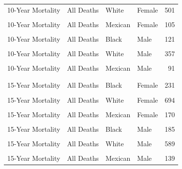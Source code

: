 \documentclass[
]{article}
\begin{document}
\begin{table}[!h]
\begin{tabular}[t]{llllr}
10-Year Mortality & All Deaths & White & Female & 501\\
\cellcolor{gray!10}{10-Year Mortality} & \cellcolor{gray!10}{CVD} & \cellcolor{gray!10}{Mexican} & \cellcolor{gray!10}{Female} & \cellcolor{gray!10}{37}\\
10-Year Mortality & All Deaths & Mexican & Female & 105\\
\cellcolor{gray!10}{10-Year Mortality} & \cellcolor{gray!10}{CVD} & \cellcolor{gray!10}{Black} & \cellcolor{gray!10}{Male} & \cellcolor{gray!10}{50}\\
10-Year Mortality & All Deaths & Black & Male & 121\\
\cellcolor{gray!10}{10-Year Mortality} & \cellcolor{gray!10}{CVD} & \cellcolor{gray!10}{White} & \cellcolor{gray!10}{Male} & \cellcolor{gray!10}{144}\\
10-Year Mortality & All Deaths & White & Male & 357\\
\cellcolor{gray!10}{10-Year Mortality} & \cellcolor{gray!10}{CVD} & \cellcolor{gray!10}{Mexican} & \cellcolor{gray!10}{Male} & \cellcolor{gray!10}{44}\\
10-Year Mortality & All Deaths & Mexican & Male & 91\\
\addlinespace\\
\cellcolor{gray!10}{15-Year Mortality} & \cellcolor{gray!10}{CVD} & \cellcolor{gray!10}{Black} & \cellcolor{gray!10}{Female} & \cellcolor{gray!10}{79}\\
15-Year Mortality & All Deaths & Black & Female & 231\\
\cellcolor{gray!10}{15-Year Mortality} & \cellcolor{gray!10}{CVD} & \cellcolor{gray!10}{White} & \cellcolor{gray!10}{Female} & \cellcolor{gray!10}{251}\\
15-Year Mortality & All Deaths & White & Female & 694\\
\cellcolor{gray!10}{15-Year Mortality} & \cellcolor{gray!10}{CVD} & \cellcolor{gray!10}{Mexican} & \cellcolor{gray!10}{Female} & \cellcolor{gray!10}{56}\\
15-Year Mortality & All Deaths & Mexican & Female & 170\\
\cellcolor{gray!10}{15-Year Mortality} & \cellcolor{gray!10}{CVD} & \cellcolor{gray!10}{Black} & \cellcolor{gray!10}{Male} & \cellcolor{gray!10}{76}\\
15-Year Mortality & All Deaths & Black & Male & 185\\
\cellcolor{gray!10}{15-Year Mortality} & \cellcolor{gray!10}{CVD} & \cellcolor{gray!10}{White} & \cellcolor{gray!10}{Male} & \cellcolor{gray!10}{225}\\
15-Year Mortality & All Deaths & White & Male & 589\\
\cellcolor{gray!10}{15-Year Mortality} & \cellcolor{gray!10}{CVD} & \cellcolor{gray!10}{Mexican} & \cellcolor{gray!10}{Male} & \cellcolor{gray!10}{57}\\
15-Year Mortality & All Deaths & Mexican & Male & 139\\
\bottomrule
\end{tabular}
\end{table}
\end{document}
